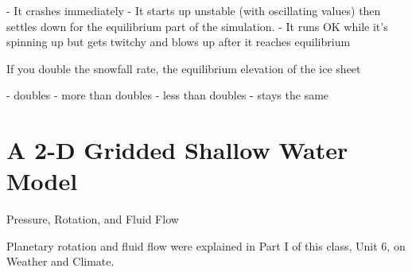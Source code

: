 {- It crashes immediately
- It starts up unstable (with oscillating values) then settles down for the equilibrium part of the simulation.
- It runs OK while it's spinning up but gets twitchy and blows up after it reaches equilibrium

If you double the snowfall rate, the equilibrium elevation of the ice sheet

 - doubles
 - more than doubles
 - less than doubles
 - stays the same

\section{A 2-D Gridded Shallow Water Model}
Pressure, Rotation, and Fluid Flow

Planetary rotation and fluid flow were explained in Part I of this class, Unit 6, on Weather and Climate.

}
